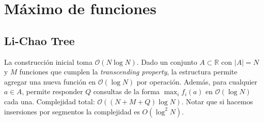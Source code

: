 \section{Máximo de funciones}

\subsection{Li-Chao Tree}
La construcción inicial toma $\mathcal{O}(N \log N)$. Dado un conjunto $A \subset \mathbb{R}$ con $|A|=N$ y $M$ funciones que cumplen la \textit{transcending property}, la estructura permite agregar una nueva función en $\mathcal{O}(\log N)$ por operación. Además, para cualquier $a \in A$, permite responder $Q$ consultas de la forma $\max_i f_i(a)$ en $\mathcal{O}(\log N)$ cada una. Complejidad total: $\mathcal{O}((N + M + Q) \log N)$. Notar que si hacemos insersiones por segmentos la complejidad es $O(\log^2 N)$.


